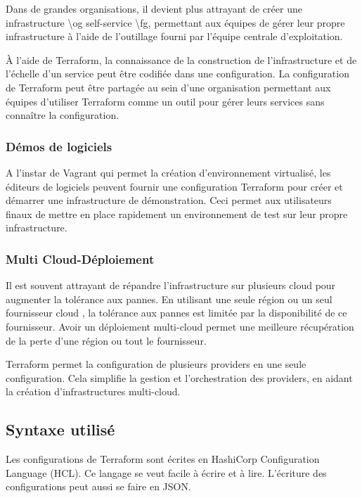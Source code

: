 \documentclass[]{article}
\begin{document}
Dans de grandes organisations, il devient plus attrayant de créer une
infrastructure \textbackslash{}og self-service \textbackslash{}fg,
permettant aux équipes de gérer leur propre infrastructure à l'aide de
l'outillage fourni par l'équipe centrale d'exploitation.

À l'aide de Terraform, la connaissance de la construction de
l'infrastructure et de l'échelle d'un service peut être codifiée dans
une configuration. La configuration de Terraform peut être partagée au
sein d'une organisation permettant aux équipes d'utiliser Terraform
comme un outil pour gérer leurs services sans connaître la
configuration.

\subsubsection{Démos de logiciels}\label{duxe9mos-de-logiciels}

A l'instar de Vagrant qui permet la création d'environnement virtualisé,
les éditeurs de logiciels peuvent fournir une configuration Terraform
pour créer et démarrer une infrastructure de démonstration. Ceci permet
aux utilisateurs finaux de mettre en place rapidement un environnement
de test sur leur propre infrastructure.

\subsubsection{Multi
Cloud-Déploiement}\label{multi-cloud-duxe9ploiement}

Il est souvent attrayant de répandre l'infrastructure sur plusieurs
cloud pour augmenter la tolérance aux pannes. En utilisant une seule
région ou un seul fournisseur cloud , la tolérance aux pannes est
limitée par la disponibilité de ce fournisseur. Avoir un déploiement
multi-cloud permet une meilleure récupération de la perte d'une région
ou tout le fournisseur.

Terraform permet la configuration de plusieurs providers en une seule
configuration. Cela simplifie la gestion et l'orchestration des
providers, en aidant la création d'infrastructures multi-cloud.

\subsection{Syntaxe utilisé}\label{syntaxe-utilisuxe9}

Les configurations de Terraform sont écrites en HashiCorp Configuration
Language (HCL). Ce langage se veut facile à écrire et à lire. L'écriture
des configurations peut aussi se faire en JSON.
\end{document}
